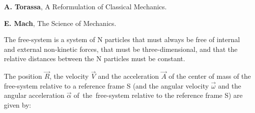 \documentclass[10pt]{article}
\begin{document}
\par \bigskip\smallskip \noindent \textbf{A. Torassa}, A Reformulation of Classical Mechanics.

\par \bigskip\smallskip \noindent \textbf{E. Mach}, The Science of Mechanics.

\newpage

\par {}

\par {}\hypertarget{p4a1}{}

\par \bigskip \noindent The free-system is a system of N particles that must always be free of internal and external non-kinetic forces, that must be three-dimensional, and that the relative distances between the N particles must be constant.

\par \bigskip \noindent The position ${\vec{\mathit{R}}}$, the velocity ${\vec{\mathit{V}}}$ and the acceleration ${\vec{\mathit{A}}}$ of the center of mass of the free-system relative to a reference frame S (and the angular velocity ${\vec{\omega}}$ and the angular acceleration ${\vec{\alpha}}$ \hbox {of the free-system} relative to the reference frame S) are given by:
\end{document}
